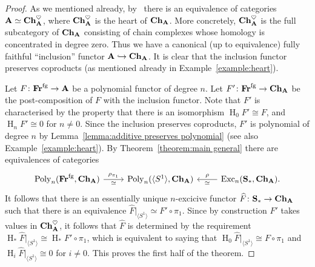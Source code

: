 \documentclass[psamsfonts]{amsart}
\theoremstyle{plain}
\theoremstyle{definition}
\theoremstyle{remark}
\newcommand{\catname}[1]{{\normalfont\textbf{#1}}}
\newcommand{\circles}{\langle S^1 \rangle}
\newcommand{\spaces}{\catname{S}_*}
\newcommand{\fr}{\allfr^{\mathrm{fg}}}
\newcommand{\allfr}{\catname{Fr}}
\newcommand{\ch}{\catname{Ch}}
\newcommand{\HH}{\operatorname{H}} %
\DeclareMathOperator{\poly}{Poly}
\DeclareMathOperator{\exc}{Exc}
\begin{document}
\begin{proof}
As we mentioned already, by~\cite[Proposition 1.3.2.19]{LurieHA} there is an equivalence of categories $\catname{A}\simeq \ch_{\catname{A}}^\heartsuit$, where $\ch_{\catname{A}}^\heartsuit$ is the heart of $\ch_{\catname{A}}$. More concretely, $\ch_{\catname{A}}^\heartsuit$ is the full subcategory of $\ch_{\catname{A}}$ consisting of chain complexes whose homology is concentrated in degree zero. Thus we have a canonical (up to equivalence) fully faithful ``inclusion'' functor $\catname{A}\hookrightarrow \ch_{\catname{A}}$. It is clear that the inclusion functor preserves coproducts (as mentioned already in Example~\ref{example:heart}).

Let $F\colon \fr\to \catname{A}$ be a polynomial functor of degree $n$. Let $F'\colon\fr\to \ch_{\catname{A}}$ be the post-composition of $F$ with the inclusion functor. Note that $F'$ is characterised by the property that there is an isomorphism $\HH_0 F'\cong F$, and $\HH_n F'\cong 0$ for $n\ne 0$. Since the inclusion preserves coproducts, $F'$ is polynomial of degree $n$ by Lemma~\ref{lemma:additive preserves polynomial} (see also Example~\ref{example:heart}). By Theorem~\ref{theorem:main general} there are equivalences of categories
\[
\begin{tikzcd}
\poly_n(\fr, \ch_{\catname{A}}) \arrow[r, "\rho_{\pi_1}", "\simeq"'] &\poly_n(\circles, \ch_{\catname{A}}) & 
\exc_n(\spaces, \ch_{\catname{A}}) \arrow[l, "\rho"', "\simeq"].
\end{tikzcd}
\]
It follows that there is an essentially unique $n$-excicive functor $\widehat F\colon \spaces \to \ch_{\catname{A}}$ such that there is an equivalence $\widehat F|_{\circles} \simeq F'\circ \pi_1$. Since by construction $F'$ takes values in $\ch_{\catname{A}}^{\heartsuit}$, it follows that $\widehat F$ is determined by the requirement $\HH_* \widehat F|_{\circles}\cong \HH_* F'\circ \pi_1$, which is equivalent to saying that $\HH_0 \widehat F|_{\circles} \cong F\circ \pi_1$ and $\HH_i \widehat F|_{\circles} \cong 0$ for $i\ne 0$. This proves the first half of the theorem.


\end{proof}
\end{document}
